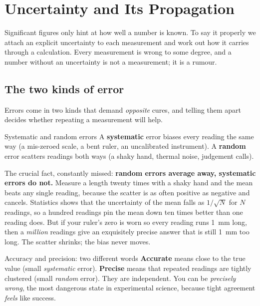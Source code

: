 \section{Uncertainty and Its Propagation}

Significant figures only hint at how well a number is known. To say it properly we attach an explicit
uncertainty to each measurement and work out how it carries through a calculation. Every measurement
is wrong to some degree, and a number without an uncertainty is not a
measurement; it is a rumour.

\subsection{The two kinds of error}

Errors come in two kinds that demand \emph{opposite} cures, and telling them apart decides whether
repeating a measurement will help.

\begin{defbox}{Systematic and random errors}
A \textbf{systematic} error biases every reading the same way (a mis-zeroed scale, a bent ruler, an
uncalibrated instrument). A \textbf{random} error scatters readings both ways (a shaky hand, thermal
noise, judgement calls).
\end{defbox}

The crucial fact, constantly missed: \textbf{random errors average away, systematic errors do not.}
Measure a length twenty times with a shaky hand and the mean beats any single reading, because the
scatter is as often positive as negative and cancels. Statistics shows that the uncertainty of the
mean falls as $1/\sqrt N$ for $N$ readings, so a hundred readings pin the mean down ten times better than one
reading does. But if your ruler's zero is worn so every reading runs
\SI{1}{mm} long, then a \emph{million} readings give an exquisitely precise answer that is still
\SI{1}{mm} too long. The scatter shrinks; the bias never moves.

\begin{defbox}{Accuracy and precision: two different words}
\textbf{Accurate} means close to the true value (small \emph{systematic} error).
\textbf{Precise} means that repeated readings are tightly clustered (small \emph{random} error).
They are independent. You can be \emph{precisely wrong}, the most dangerous state in experimental
science, because tight agreement \emph{feels} like success.
\end{defbox}

